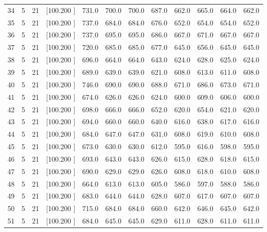 \documentclass[12pt,a4paper]{article}
\begin{document}
\begin{center}
{\begin{tabular}{r r r r r r r r r r r r}
  34&  5& 21&[100.200   ]&   731.0&   700.0&   700.0&   687.0&   662.0&   665.0&   664.0&   662.0\\[-0.02in]
  35&  5& 21&[100.200   ]&   737.0&   684.0&   684.0&   676.0&   652.0&   654.0&   654.0&   652.0\\[-0.02in]
  36&  5& 21&[100.200   ]&   737.0&   695.0&   695.0&   686.0&   667.0&   671.0&   667.0&   667.0\\[-0.02in]
  37&  5& 21&[100.200   ]&   720.0&   685.0&   685.0&   677.0&   645.0&   656.0&   645.0&   645.0\\[-0.02in]
  38&  5& 21&[100.200   ]&   696.0&   664.0&   664.0&   643.0&   624.0&   628.0&   625.0&   624.0\\[-0.02in]
  39&  5& 21&[100.200   ]&   689.0&   639.0&   639.0&   621.0&   608.0&   613.0&   611.0&   608.0\\[-0.02in]
  40&  5& 21&[100.200   ]&   746.0&   690.0&   690.0&   688.0&   671.0&   686.0&   673.0&   671.0\\[-0.02in]
  41&  5& 21&[100.200   ]&   674.0&   626.0&   626.0&   624.0&   600.0&   609.0&   606.0&   600.0\\[-0.02in]
  42&  5& 21&[100.200   ]&   698.0&   666.0&   666.0&   652.0&   620.0&   654.0&   621.0&   620.0\\[-0.02in]
  43&  5& 21&[100.200   ]&   694.0&   660.0&   660.0&   640.0&   616.0&   638.0&   617.0&   616.0\\[-0.02in]
  44&  5& 21&[100.200   ]&   684.0&   647.0&   647.0&   631.0&   608.0&   619.0&   610.0&   608.0\\[-0.02in]
  45&  5& 21&[100.200   ]&   673.0&   630.0&   630.0&   612.0&   595.0&   616.0&   598.0&   595.0\\[-0.02in]
  46&  5& 21&[100.200   ]&   693.0&   643.0&   643.0&   626.0&   615.0&   628.0&   618.0&   615.0\\[-0.02in]
  47&  5& 21&[100.200   ]&   690.0&   629.0&   629.0&   626.0&   608.0&   618.0&   610.0&   608.0\\[-0.02in]
  48&  5& 21&[100.200   ]&   664.0&   613.0&   613.0&   605.0&   586.0&   597.0&   588.0&   586.0\\[-0.02in]
  49&  5& 21&[100.200   ]&   683.0&   644.0&   644.0&   628.0&   607.0&   617.0&   607.0&   607.0\\[-0.02in]
  50&  5& 21&[100.200   ]&   715.0&   684.0&   684.0&   660.0&   642.0&   646.0&   645.0&   642.0\\[-0.02in]
  51&  5& 21&[100.200   ]&   684.0&   645.0&   645.0&   629.0&   611.0&   628.0&   611.0&   611.0\\[-0.02in]

\end{tabular}}
\end{center}
\end{document}
